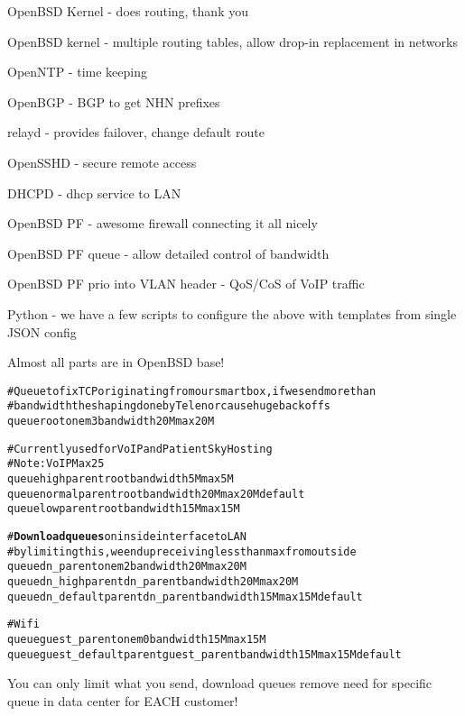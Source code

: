 \documentclass[18pt,landscape,a4paper,footrule]{foils}
\begin{document}

\begin{list2}
\item OpenBSD Kernel - does routing, thank you
\item OpenBSD kernel - multiple routing tables, allow drop-in replacement in networks
\item OpenNTP - time keeping
\item OpenBGP - BGP to get NHN prefixes
\item relayd - provides failover, change default route
\item OpenSSHD - secure remote access
\item DHCPD - dhcp service to LAN
\item OpenBSD PF - awesome firewall connecting it all nicely
\item OpenBSD PF queue - allow detailed control of bandwidth
\item OpenBSD PF prio into VLAN header - QoS/CoS of VoIP traffic
\item Python - we have a few scripts to configure the above with templates from single JSON config
\end{list2}

\centerline{Almost all parts are in OpenBSD base!}


\begin{alltt}\footnotesize
# Queue to fix TCP originating from our smartbox, if we send more than
# bandwidth the shaping done by Telenor cause huge backoffs
queue root on em3 bandwidth 20M max 20M

# Currently used for VoIP and PatientSky Hosting
# Note: VoIP Max 25% of bandwidth, excess dropped by provider!
queue high parent root bandwidth 5M max 5M
queue normal parent root bandwidth 20M max 20M default
queue low parent root bandwidth 15M max 15M

# {\bf Download queues} on inside interface to LAN
# by limiting this, we end up receiving less than max from outside
queue dn_parent on em2 bandwidth 20M max 20M
queue dn_high parent dn_parent bandwidth 20M max 20M
queue dn_default parent dn_parent bandwidth 15M max 15M default

# Wifi
queue guest_parent on em0 bandwidth 15M max 15M
queue guest_default parent guest_parent bandwidth 15M max 15M default
\end{alltt}

You can only limit what you send, download queues remove need for
specific queue in data center for EACH customer!
\end{document}

